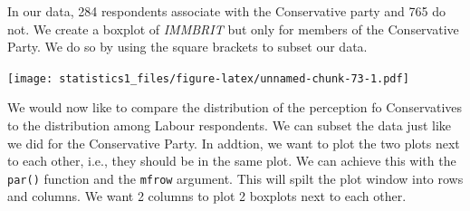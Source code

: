 \documentclass[]{book}
\newenvironment{Shaded}{\begin{snugshade}}{\end{snugshade}}
\newcommand{\KeywordTok}[1]{\textcolor[rgb]{0.13,0.29,0.53}{\textbf{#1}}}
\newcommand{\DataTypeTok}[1]{\textcolor[rgb]{0.13,0.29,0.53}{#1}}
\newcommand{\DecValTok}[1]{\textcolor[rgb]{0.00,0.00,0.81}{#1}}
\newcommand{\StringTok}[1]{\textcolor[rgb]{0.31,0.60,0.02}{#1}}
\newcommand{\CommentTok}[1]{\textcolor[rgb]{0.56,0.35,0.01}{\textit{#1}}}
\newcommand{\OtherTok}[1]{\textcolor[rgb]{0.56,0.35,0.01}{#1}}
\newcommand{\OperatorTok}[1]{\textcolor[rgb]{0.81,0.36,0.00}{\textbf{#1}}}
\newcommand{\NormalTok}[1]{#1}
\theoremstyle{definition}
\theoremstyle{definition}
\theoremstyle{definition}
\theoremstyle{remark}
\begin{document}
In our data, 284 respondents associate with the Conservative party and
765 do not. We create a boxplot of \emph{IMMBRIT} but only for members
of the Conservative Party. We do so by using the square brackets to
subset our data.

\begin{Shaded}
\end{Shaded}

\texttt{[image: statistics1\_files/figure-latex/unnamed-chunk-73-1.pdf]}

We would now like to compare the distribution of the perception fo
Conservatives to the distribution among Labour respondents. We can
subset the data just like we did for the Conservative Party. In addtion,
we want to plot the two plots next to each other, i.e., they should be
in the same plot. We can achieve this with the \texttt{par()} function
and the \texttt{mfrow} argument. This will spilt the plot window into
rows and columns. We want 2 columns to plot 2 boxplots next to each
other.

\begin{Shaded}
\end{Shaded}
\end{document}
